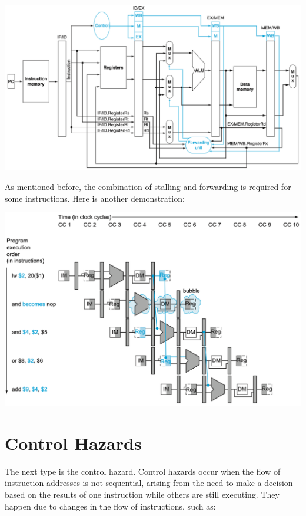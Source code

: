 \begin{center}
  \includegraphics[width=\textwidth]{Figure/pipeline_datapath.png}
\end{center}

As mentioned before, the combination of stalling and forwarding is required for some instructions. Here is another demonstration:

\begin{center}
  \includegraphics[width=\textwidth]{Figure/pipeline_stall_forw_2.png}
\end{center}

\section{Control Hazards}
The next type is the control hazard. Control hazards occur when the flow of instruction addresses is not sequential, arising from the need to make a decision based on the results of one instruction while others are still executing. They happen due to changes in the flow of instructions, such as:

